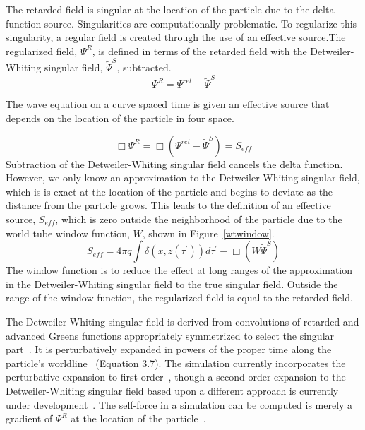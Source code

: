 The retarded field is singular at the location of the particle due to the delta function source. Singularities are computationally problematic. To regularize this singularity, a regular field is created through the use of an effective source.The regularized field, $\Psi^R$, is defined in terms of the retarded field with the Detweiler-Whiting singular field, $\tilde{\Psi}^S$, subtracted. 
\begin{equation}
\Psi^R=\Psi^{ret}-\tilde{\Psi}^S
\end{equation}


The wave equation on a curve spaced time is given an effective source that depends on the location of the particle in four space.

\begin{equation}
  \Box\Psi^R=\Box(\Psi^{ret}-\tilde{\Psi}^S)=S_{eff}
\end{equation}
Subtraction of the Detweiler-Whiting singular field cancels the delta function. However, we only know an approximation to the Detweiler-Whiting singular field, which is is exact at the location of the particle and begins to deviate as the distance from the particle grows. This leads to the definition of an effective source, $S_{eff}$, which is zero outside the neighborhood of the particle due to the world tube window function, $W$, shown in Figure~\ref{wtwindow}.
\begin{equation}
S_{eff}=4\pi q\int\delta(x,z(\tau^\prime))d\tau^\prime-\Box(W\tilde{\Psi}^S)
\end{equation}
The window function is to reduce the effect at long ranges of the approximation in the Detweiler-Whiting singular field to the true singular field. Outside the range of the window function, the regularized field is equal to the retarded field.


The Detweiler-Whiting singular field is derived from convolutions of retarded and advanced Greens functions appropriately symmetrized to select the singular part~\cite{detweiler_whiting}. It is perturbatively expanded in powers of the proper time along the particle's worldline~\cite{heffernan_ottewil_wardell_modesum_basisForCode} (Equation 3.7). The simulation currently incorporates the perturbative expansion to first order~\cite{heffernan_ottewil_wardell_modesum_basisForCode}, though a second order expansion to the Detweiler-Whiting singular field based upon a different approach is currently under development~\cite{pound2ndOrderSelfForce}. The self-force in a simulation can be computed is merely a gradient of $\Psi^R$ at the location of the particle~\cite{vega_wardell_diener_2011}. 



